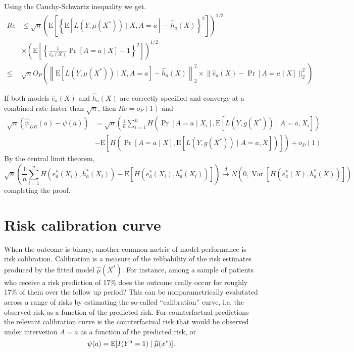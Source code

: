 Using the Cauchy-Schwartz inequality we get.
$$
\begin{aligned}
Re & \leq \sqrt{n}\left(\mathrm{E}\left[\left\{\mathrm{E}\left[L\left(Y, \mu\left(X^*\right)\right) \mid X, A=a\right]-\widehat{h}_a(X)\right\}^2\right]\right)^{1 / 2} \\
& \times\left(\mathrm{E}\left[\left\{\frac{1}{\widehat{e}_a(X)} \operatorname{Pr}[A=a \mid X]-1\right\}^2\right]\right)^{1 / 2} \\
\leq & \sqrt{n} O_P\left(\left\|\mathrm{E}\left[L\left(Y, \mu\left(X^*\right)\right) \mid X, A=a\right]-\widehat{h}_a(X)\right\|_2^2 \times\Big\|\widehat{e}_a(X)-\operatorname{Pr}[A=a \mid X]\Big\|_2^2\right)
\end{aligned}
$$

If both models $\widehat{e}_a(X)$ and $\widehat{h}_a(X)$ are correctly specified and converge at a combined rate faster than $\sqrt{n}$, then $R e=o_P(1)$ and
$$
\begin{aligned}
\sqrt{n}\left(\widehat{\psi}_{DR}(a)-\psi(a)\right) & =\sqrt{n}\left(\frac{1}{n} \sum_{i=1}^n H\left(\operatorname{Pr}\left[A=a \mid X_i\right], \mathrm{E}\left[L\left(Y, g\left(X^*\right)\right) \mid A=a, X_i\right]\right)\right. \\
& \left.-\mathrm{E}\left[H\left(\operatorname{Pr}[A=a \mid X], \mathrm{E}\left[L\left(Y, g\left(X^*\right)\right) \mid A=a, X\right]\right)\right]\right)+o_P(1)
\end{aligned}
$$
By the central limit theorem,
$$
\sqrt{n}\left(\frac{1}{n} \sum_{i=1}^n H\left(e^*_a(X_i), h^*_a(X_i)\right)-\mathrm{E}\left[H\left(e^*_a(X_i), h^*_a(X_i)\right)\right]\right) \stackrel{d}{\longrightarrow} N\left(0, \operatorname{Var}\left[H\left(e^*_a(X), h^*_a(X)\right)\right]\right)
$$
completing the proof.
\newpage 
\section{Risk calibration curve}\label{sec:calib}
When the outcome is binary, another common metric of model performance is risk calibration. Calibration is a measure of the relibability of the risk estimates produced by the fitted model $\widehat{\mu}(X^*)$. For instance, among a sample of patients who receive a risk prediction of 17\% does the outcome really occur for roughly 17\% of them over the follow up period? This can be nonparametrically evalutated across a range of risks by estimating the so-called ``calibration'' curve, i.e. the observed risk as a function of the predicted risk. For counterfactual predictions the relevant calibration curve is the counterfactual risk that would be observed under intervetion $A=a$ as a function of the predicted risk, or
\begin{equation}\label{eqn:calib_estimand}
    \psi(a) = \operatorname{E}[I(Y^a = 1) \mid \widehat{\mu}(x^*)].
\end{equation}

